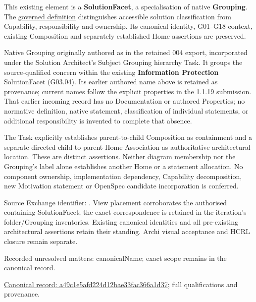 This existing element is a \textbf{SolutionFacet}, a specialisation of native
\textbf{Grouping}. The \href{\detokenize{../../../../../../../governance/continuum-representation.md#solutionfacet-classification--1119-candidate}}{governed definition}
distinguishes accessible solution classification from Capability, responsibility
and ownership. Its canonical identity, G01–G18 context, existing Composition
and separately established Home assertions are preserved.



Native Grouping originally authored as \texttt{} in the retained 004 export,
incorporated under the Solution Architect's Subject Grouping hierarchy Task.
It groups the source-qualified \texttt{} concern within
the existing \textbf{Information Protection} SolutionFacet (G03.04). Its earlier authored name above is retained as provenance; current names
follow the explicit properties in the 1.1.19 submission.
That earlier incoming record has no Documentation or authored Properties; no normative
definition, native statement, classification of individual statements, or
additional responsibility is invented to complete that absence.



The Task explicitly establishes parent-to-child Composition as containment and
a separate directed child-to-parent Home Association as authoritative architectural
location. These are distinct assertions. Neither diagram membership nor the
Grouping's label alone establishes another Home or a statement allocation.
No component ownership, implementation dependency, Capability decomposition,
new Motivation statement or OpenSpec candidate incorporation is conferred.



Source Exchange identifier: \texttt{}. View placement corroborates
the authorised containing SolutionFacet; the exact correspondence is retained in the
iteration's folder/Grouping inventories. Existing canonical identities and all
pre-existing architectural assertions retain their standing. Archi visual
acceptance and HCRL closure remain separate.


{\small Recorded unresolved matters: canonicalName; exact scope remains in the canonical record.}\par
{\footnotesize \href{../../../../../../../continuum/grouping/a49c1e5afd224d12bae33fac366a1d37.md}{Canonical record: a49c1e5afd224d12bae33fac366a1d37}; full qualifications and provenance.}\par
